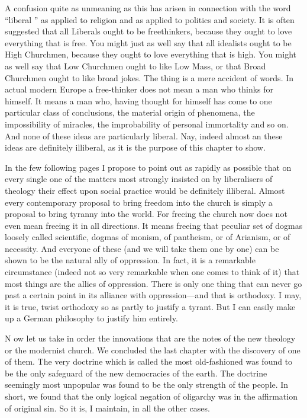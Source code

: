 \documentclass{book}
\begin{document}
A confusion quite as unmeaning as this has arisen in connection with the word “liberal ” as applied to religion and as applied to politics and society. It is often suggested that all Liberals ought to be freethinkers, because they ought to love everything that is free. You might just as well say that all idealists ought to be High Churchmen, because they ought to love everything that is high. You might as well say that Low Churchmen ought to like Low Mass, or that Broad Churchmen ought to like broad jokes. The thing is a mere accident of words. In actual modern Europe a free-thinker does not mean a man who thinks for himself. It means a man who, having thought for himself has come to one particular class of conclusions, the material origin of phenomena, the impossibility of miracles, the improbability of personal immortality and so on. And none of these ideas are particularly liberal. Nay, indeed almost an these ideas are definitely illiberal, as it is the purpose of this chapter to show.

In the few following pages I propose to point out as rapidly as possible that on every single one of the matters most strongly insisted on by liberalisers of theology their effect upon social practice would be definitely illiberal. Almost every contemporary proposal to bring freedom into the church is simply a proposal to bring tyranny into the world. For freeing the church now does not even mean freeing it in all directions. It means freeing that peculiar set of dogmas loosely called scientific, dogmas of monism, of pantheism, or of Arianism, or of necessity. And everyone of these (and we will take them one by one) can be shown to be the natural ally of oppression. In fact, it is a remarkable circumstance (indeed not so very remarkable when one comes to think of it) that most things are the allies of oppression. There is only one thing that can never go past a certain point in its alliance with oppression—and that is orthodoxy. I may, it is true, twist orthodoxy so as partly to justify a tyrant. But I can easily make up a German philosophy to justify him entirely.

N ow let us take in order the innovations that are the notes of the new theology or the modernist church. We concluded the last chapter with the discovery of one of them. The very doctrine which is called the most old-fashioned was found to be the only safeguard of the new democracies of the earth. The doctrine seemingly most unpopular was found to be the only strength of the people. In short, we found that the only logical negation of oligarchy was in the affirmation of original sin. So it is, I maintain, in all the other cases.
\end{document}

